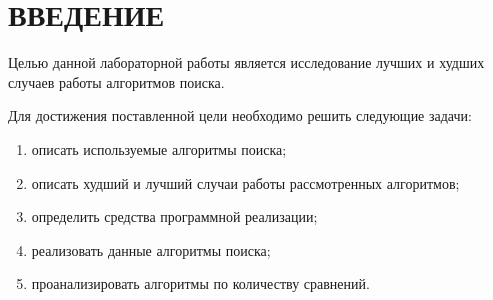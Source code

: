 \chapter*{ВВЕДЕНИЕ}

Целью данной лабораторной работы является исследование лучших и худших случаев работы алгоритмов поиска.

Для достижения поставленной цели необходимо решить следующие задачи:
\begin{enumerate}[label={\arabic*)}]
    \item описать используемые алгоритмы поиска;
    \item описать худший и лучший случаи работы рассмотренных алгоритмов;
    \item определить средства программной реализации;
    \item реализовать данные алгоритмы поиска;
    \item проанализировать алгоритмы по количеству сравнений.
\end{enumerate}